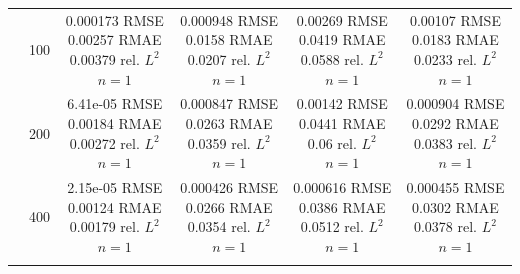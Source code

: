 \begin{tabular}{llcccc}
 & 100 & \shortstack{0.000173 RMSE\\0.00257 RMAE\\0.00379 rel. $L^2$\\$n=1$} & \shortstack{0.000948 RMSE\\0.0158 RMAE\\0.0207 rel. $L^2$\\$n=1$} & \shortstack{0.00269 RMSE\\0.0419 RMAE\\0.0588 rel. $L^2$\\$n=1$} & \shortstack{0.00107 RMSE\\0.0183 RMAE\\0.0233 rel. $L^2$\\$n=1$} \\
 & 200 & \shortstack{6.41e-05 RMSE\\0.00184 RMAE\\0.00272 rel. $L^2$\\$n=1$} & \shortstack{0.000847 RMSE\\0.0263 RMAE\\0.0359 rel. $L^2$\\$n=1$} & \shortstack{0.00142 RMSE\\0.0441 RMAE\\0.06 rel. $L^2$\\$n=1$} & \shortstack{0.000904 RMSE\\0.0292 RMAE\\0.0383 rel. $L^2$\\$n=1$} \\
 & 400 & \shortstack{2.15e-05 RMSE\\0.00124 RMAE\\0.00179 rel. $L^2$\\$n=1$} & \shortstack{0.000426 RMSE\\0.0266 RMAE\\0.0354 rel. $L^2$\\$n=1$} & \shortstack{0.000616 RMSE\\0.0386 RMAE\\0.0512 rel. $L^2$\\$n=1$} & \shortstack{0.000455 RMSE\\0.0302 RMAE\\0.0378 rel. $L^2$\\$n=1$} \\
\addlinespace
\bottomrule
\end{tabular}
